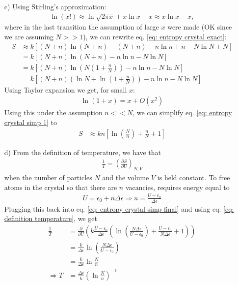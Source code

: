 \documentclass[11pt]{article}
\newcounter{excount}
\newenvironment{exercise}[1][]{\addtocounter{excount}{1} \noindent {\bf Exercise
    \arabic{excount} #1}\hspace{2mm}}{\vspace{4mm}}
\begin{document}
\begin{exercise}
\begin{itemize}
		\item[c)]
			Using Stirling's approximation:
			\begin{align}
				\ln (x!) \approx \ln \sqrt{2\pi x} + x\ln x - x \approx x\ln x - x,
			\end{align}
			where in the last transition the assumption of large $x$ were made (OK since we are assuming $N>>1$), we can rewrite eq. \eqref{eq: entropy crystal exact}:
			\begin{align}
				S	&\approx k\left[(N+n)\ln (N+n) - (N+n) - n\ln n + n - N\ln N + N \right] \nonumber \\
					&= k\left[(N+n)\ln(N+n) - n\ln n - N \ln N \right] \nonumber \\
					&= k\left[(N+n) \ln \left( N \left( 1+\frac{n}{N} \right) \right) -n \ln n - N \ln N \right] \nonumber \\
					&= k \left[ (N+n) \left( \ln N + \ln \left( 1+\frac{n}{N} \right) \right) - n\ln n - N\ln N \right] \label{eq: entropy crystal simp 1}
			\end{align}
			Using Taylor expansion we get, for small $x$:
			\begin{align*}
				\ln (1+x) = x + O(x^2)
			\end{align*}
			Using this under the assumption $n << N$, we can simplify eq. \eqref{eq: entropy crystal simp 1} to
			\begin{align}
				S 	&\approx kn\left[\ln \left( \frac{N}{n} \right) +\frac{n}{N} + 1  \right] \label{eq: entropy crystal simp final}
			\end{align}
		
		
		
		
		
		\item[d)]
			From the definition of temperature, we have that
			\begin{align}
				\frac{1}{T} = \left( \frac{\partial S}{\partial U} \right) _{N,V} \label{eq: definition temperature}
			\end{align}
			when the number of particles $N$ and the volume $V$ is held constant. To free atoms in the crystal so that there are $n$ vacancies, requires energy equal to
			\begin{align*}
				U = \epsilon_0 + n\Delta \epsilon \Rightarrow n = \frac{U - \epsilon_0}{\Delta \epsilon}
			\end{align*}
			Plugging this back into eq. \eqref{eq: entropy crystal simp final} and using eq. \eqref{eq: definition temperature}, we get
			\begin{align*}
				\frac{1}{T} 	&= \frac{\partial}{\partial U} \left( k \frac{U-\epsilon_0}{\Delta \epsilon} \left( \ln \left( \frac{N \Delta \epsilon}{U-\epsilon_0} \right) + \frac{U-\epsilon_0}{N\Delta \epsilon} + 1 \right)  \right) \\
									&= \frac{k}{\Delta \epsilon} \ln \left( \frac{N\Delta \epsilon}{U-\epsilon_0} \right)  \\
									&= \frac{k}{\Delta \epsilon} \ln \frac{N}{n} \\
			\Rightarrow T	&= \frac{\Delta \epsilon}{k} \left(\ln \frac{N}{n}\right) ^{-1}
			\end{align*}
			

\end{itemize}
\end{exercise}
\end{document}
